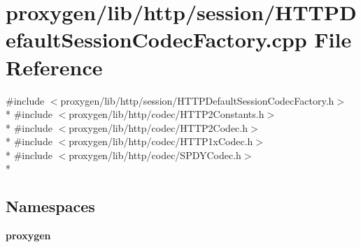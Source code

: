 \section{proxygen/lib/http/session/\+H\+T\+T\+P\+Default\+Session\+Codec\+Factory.cpp File Reference}
\label{HTTPDefaultSessionCodecFactory_8cpp}
{\ttfamily \#include $<$proxygen/lib/http/session/\+H\+T\+T\+P\+Default\+Session\+Codec\+Factory.\+h$>$}\\*
{\ttfamily \#include $<$proxygen/lib/http/codec/\+H\+T\+T\+P2\+Constants.\+h$>$}\\*
{\ttfamily \#include $<$proxygen/lib/http/codec/\+H\+T\+T\+P2\+Codec.\+h$>$}\\*
{\ttfamily \#include $<$proxygen/lib/http/codec/\+H\+T\+T\+P1x\+Codec.\+h$>$}\\*
{\ttfamily \#include $<$proxygen/lib/http/codec/\+S\+P\+D\+Y\+Codec.\+h$>$}\\*
\subsection*{Namespaces}
\begin{DoxyCompactItemize}
\item 
 {\bf proxygen}
\end{DoxyCompactItemize}
